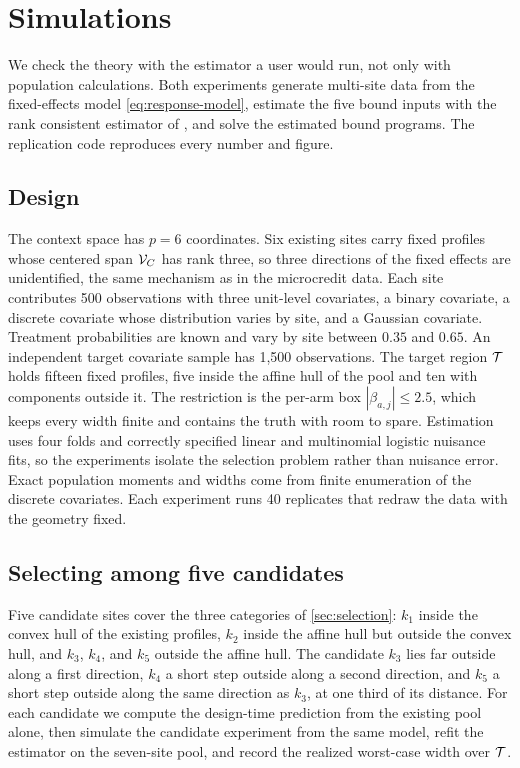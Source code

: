 \section{Simulations}
\label{sec:simulation}

We check the theory with the estimator a user would run, not only with
population calculations. Both experiments generate multi-site data
from the fixed-effects model \eqref{eq:response-model}, estimate the
five bound inputs with the rank consistent estimator of
\citet{boyarsky2026}, and solve the estimated bound programs. The
replication code reproduces every number and figure.

\subsection{Design}
\label{subsec:sim-design}

The context space has $p=6$ coordinates. Six existing sites carry fixed
profiles whose centered span $\mathcal V_C$ has rank three, so three
directions of the fixed effects are unidentified, the same mechanism as
in the microcredit data. Each site contributes 500 observations with
three unit-level covariates, a binary covariate, a discrete covariate
whose distribution varies by site, and a Gaussian covariate. Treatment
probabilities are known and vary by site between $0.35$ and $0.65$. An
independent target covariate sample has 1{,}500 observations. The
target region $\mathcal T$ holds fifteen fixed profiles, five inside the
affine hull of the pool and ten with components outside it. The
restriction is the per-arm box $|\beta_{a,j}|\leq 2.5$, which keeps
every width finite and contains the truth with room to spare. Estimation
uses four folds and correctly specified linear and multinomial logistic
nuisance fits, so the experiments isolate the selection problem rather
than nuisance error. Exact population moments and widths come from
finite enumeration of the discrete covariates. Each experiment runs 40
replicates that redraw the data with the geometry fixed.

\subsection{Selecting among five candidates}
\label{subsec:sim-selection}

Five candidate sites cover the three categories of \cref{sec:selection}:
$k_1$ inside the convex hull of the existing profiles, $k_2$ inside the
affine hull but outside the convex hull, and $k_3$, $k_4$, and $k_5$
outside the affine hull. The candidate $k_3$ lies far outside along a
first direction, $k_4$ a short step outside along a second direction,
and $k_5$ a short step outside along the same direction as $k_3$, at one
third of its distance. For each candidate we
compute the design-time prediction from the existing pool alone, then
simulate the candidate experiment from the same model, refit the
estimator on the seven-site pool, and record the realized worst-case
width over $\mathcal T$.

